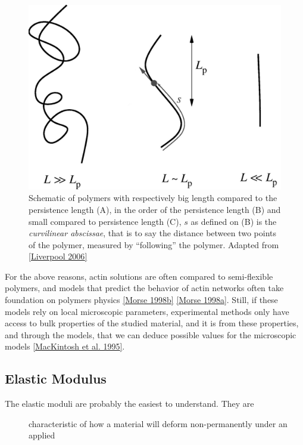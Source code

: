 \documentclass[A4paperpaper,11pt,english]{sphinxmanual}
\begin{document}
\begin{figure}[htbp]
\centering
\capstart

\includegraphics[width=0.600\linewidth]{F2_large.jpg}
\caption{Schematic of polymers with respectively big length compared to the persistence
length (A), in the order of the persistence length (B) and small compared
to persistence length (C), \(s\) as defined on (B) is the \emph{curvilinear
abscissae}, that is to say the distance between two points of the polymer,
measured by ``following'' the polymer. Adapted from {\hyperref[index-latex:liverpool2006]{{[}Liverpool  2006{]}}}}\label{index-latex:fig-persistence-length}\end{figure}

For the above reasons, actin solutions are often compared to semi-flexible
polymers, and models that predict the behavior of actin networks often take
foundation on polymers physics {\hyperref[index-latex:morse1998b]{{[}Morse  1998b{]}}} {\hyperref[index-latex:morse1998a]{{[}Morse  1998a{]}}}. Still, if
these models rely on local microscopic parameters, experimental methods only
have access to bulk properties of the studied material, and it is from these
properties, and through the models, that we can deduce possible values for the
microscopic models {\hyperref[index-latex:mackintosh1995]{{[}MacKintosh et al. 1995{]}}}.


\subsection{Elastic Modulus}
\label{index-latex:elastic-modulus}\label{index-latex:id66}\begin{description}
\item[{The elastic moduli are probably the easiest to understand. They are}] \leavevmode
characteristic of how a material will deform non-permanently under an applied

\end{description}
\end{document}
